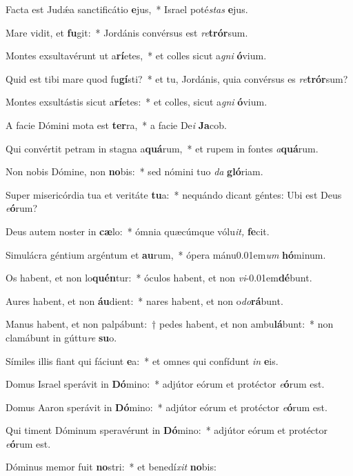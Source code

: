 \item Facta est Judǽa sanctificátio \textbf{e}jus,~* Israel poté\tinyhspace\textit{stas} \textbf{e}jus.
\item Mare vidit, et \textbf{fu}git:~* Jordánis convérsus est \textit{re}\textbf{trór}sum.
\item Montes exsultavérunt ut a\textbf{rí}etes,~* et colles sicut a\textit{gni} \textbf{ó}vium.
\item Quid est tibi mare quod fu\textbf{gí}sti?~* et tu, Jordánis, quia convérsus es \textit{re}\textbf{trór}sum?
\item Montes exsultástis sicut a\textbf{rí}etes:~* et colles, sicut a\textit{gni} \textbf{ó}vium.
\item A facie Dómini mota est \textbf{ter}ra,~* a facie De\tinyhspace\textit{i} \textbf{Ja}cob.
\item Qui convértit petram in stagna a\textbf{quá}rum,~* et rupem in fontes \textit{a}\textbf{quá}rum.
\item Non nobis Dómine, non \textbf{no}bis:~* sed nómini tuo \textit{da} \textbf{gló}riam.
\item Super misericórdia tua et veritáte \textbf{tu}a:~* nequándo dicant géntes: Ubi est Deus \textit{e}\textbf{ó}rum?
\item Deus autem noster in \textbf{cæ}lo:~* ómnia quæcúmque vólu\textit{it,} \textbf{fe}cit.
\item Simulácra géntium argéntum et \textbf{au}rum,~* ópera mánu\kern 0.01em\textit{um} \textbf{hó}minum.
\item Os habent, et non lo\textbf{quén}tur:~* óculos habent, et non \textit{vi}\kern -0.01em\textbf{dé}bunt.
\item Aures habent, et non \textbf{áu}dient:~* nares habent, et non o\textit{do}\textbf{rá}bunt.
\item Manus habent, et non palpábunt:~† pedes habent, et non ambu\textbf{lá}bunt:~* non clamábunt in gúttu\textit{re} \textbf{su}o.
\item Símiles illis fiant qui fáciunt \textbf{e}a:~* et omnes qui confídunt \textit{in} \textbf{e}is.
\item Domus Israel sperávit in \textbf{Dó}mino:~* adjútor eórum et protéctor \textit{e}\textbf{ó}rum est.
\item Domus Aaron sperávit in \textbf{Dó}mino:~* adjútor eórum et protéctor \textit{e}\textbf{ó}rum est.
\item Qui timent Dóminum speravérunt in \textbf{Dó}mino:~* adjútor eórum et protéctor \textit{e}\textbf{ó}rum est.
\item Dóminus memor fuit \textbf{no}stri:~* et benedí\tinyhspace\textit{xit} \textbf{no}bis:

